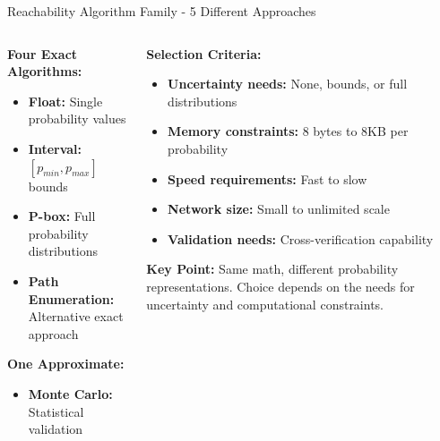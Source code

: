 \documentclass[aspectratio=169]{beamer}
\begin{document}
\begin{frame}{\textcolor{juliapurple}{Reachability Algorithm Family - 5 Different Approaches}}
\begin{columns}
\begin{column}{0.48\textwidth}
\textbf{\textcolor{juliablue}{Four Exact Algorithms:}}
\begin{itemize}
    \item \textbf{Float:} Single probability values
    \item \textbf{Interval:} $[p_{min}, p_{max}]$ bounds
    \item \textbf{P-box:} Full probability distributions  
    \item \textbf{Path Enumeration:} Alternative exact approach
\end{itemize}

\vspace{0.3cm}
\textbf{\textcolor{juliared}{One Approximate:}}
\begin{itemize}
    \item \textbf{Monte Carlo:} Statistical validation
\end{itemize}
\end{column}

\begin{column}{0.50\textwidth}
\textbf{\textcolor{juliagreen}{Selection Criteria:}}
\begin{itemize}
    \item \textbf{Uncertainty needs:} None, bounds, or full distributions
    \item \textbf{Memory constraints:} 8 bytes to 8KB per probability
    \item \textbf{Speed requirements:} Fast to slow
    \item \textbf{Network size:} Small to unlimited scale
    \item \textbf{Validation needs:} Cross-verification capability
\end{itemize}

\vspace{0.3cm}
\textbf{\textcolor{juliagreen}{Key Point:}}
Same math, different probability representations. Choice depends on the needs for uncertainty and computational constraints.
\end{column}
\end{columns}
\end{frame}
\end{document}
